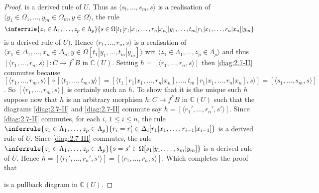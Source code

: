 \begin{proof}
  is a derived rule of \(U\).
  Thus as \(\langle  s_!, \ldots, s_m, s \rangle\) is a realisation of \(\langle y_1 \in \Omega_1, \ldots, y_m \in \Omega_m, y \in \Omega \rangle\), the rule 
  \[
    \inferrule{z_1 \in \Lambda_1, \ldots, z_p \in \Lambda_p}{s \in \Omega [t_1[r_1|x_1, \ldots, r_n|x_n]|y_1, \ldots, t_m[r_1|x_1, \ldots, r_n|x_n]|y_m}
  \]
  is a derived rule of \(U)\).
  Hence \(\langle r_1,\ldots,r_n, s \rangle\) is a realisation of \(\langle x_1 \in \Delta_1, \ldots, x_n \in \Delta_n, y \in \Omega[t_1|y_1, \ldots, t_m|y_m] \rangle\) wrt \(\langle z_1 \in \Lambda_1, \ldots, z_p \in \Lambda_p \rangle\) and thus \([\langle r_1, \ldots, r_n,s \rangle] : C \rightarrow f^*B\) in \(\mathbb C (U)\).
  Setting \(h = [\langle  r_1, \ldots, r_n, s \rangle]\) then \ref{diag:2.7-II} commutes because \([\langle r_1, \ldots, r_m, s \rangle] \circ [\langle t_1, \ldots, t_m,y \rangle] = [\langle t_1[r_1|x_1, \ldots, r_n|x_n], \ldots, t_m[r_1|x_1, \ldots, r_n|x_n],s \rangle] = [\langle s_1, \ldots, s_m,s \rangle]\).
  So \([\langle r_1, \ldots, r_m, s \rangle]\) is certainly such an \(h\).
  To show that it is the unique such \(h\) suppose now that \(h\) is an arbitrary morphism \(h:C \rightarrow f^*B\) in \(\mathbb C(U)\) such that the diagrams \ref{diag:2.7-II} and \ref{diag:2.7-II} commute say \(h = [\langle r_1', \ldots, r_n', s' \rangle]\).
  Since \ref{diag:2.7-II} commutes, for each \(i\), \(1 \leq i \leq n\), the rule \(\inferrule{z_1 \in \Lambda_1, \ldots, z_p \in \Lambda_p}{r_i = r_i' \in \Delta_i[r_1|x_1, \ldots, r_{i-1}|x_{i-1}]}\) is a derived rule of \(U\).
  Since \ref{diag:2.7-III} commutes, the rule \(\inferrule{z_1 \in \Lambda_1, \ldots, z_p \in \Lambda_p}{s=s' \in \Omega[s_1|y_1, \ldots,s_m|y_m]}\) is a derived rule of \(U\).
  Hence \(h = [\langle r_1', \ldots, r_n', s' \rangle] = [\langle r_1, \ldots, r_n, s \rangle]\).
  Which completes the proof that
  \begin{center}
  \end{center}
  is a pullback diagram in \(\mathbb C(U)\).


\end{proof}
